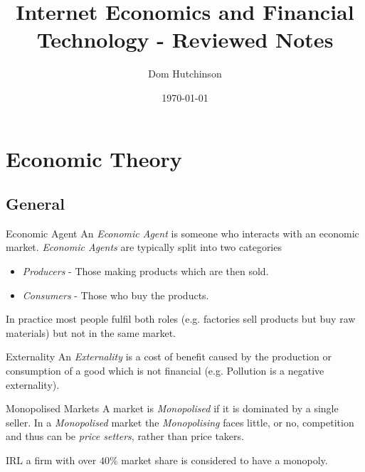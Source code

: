 \documentclass[11pt,a4paper]{article}
\begin{document}
\title{Internet Economics and Financial Technology - Reviewed Notes}
\author{Dom Hutchinson}
\date{\today}
\maketitle

\tableofcontents\newpage

\section{Economic Theory} \label{sec_EconomicTheory}

\subsection{General} \label{sec_GeneralEconomicTheory}

  \begin{definition}{Economic Agent}
    An \textit{Economic Agent} is someone who interacts with an economic market. \textit{Economic Agents} are typically split into two categories
    \begin{itemize}
      \item \textit{Producers} - Those making products which are then sold.
      \item \textit{Consumers} - Those who buy the products.
    \end{itemize}
    In practice most people fulfil both roles (e.g. factories sell products but buy raw materials) but not in the same market.
  \end{definition}

  \begin{definition}{Externality}
    An \textit{Externality} is a cost of benefit caused by the production or consumption of a good which is not financial (e.g. Pollution is a negative externality).
  \end{definition}

  \begin{definition}{Monopolised Markets}
    A market is \textit{Monopolised} if it is dominated by a single seller. In a \textit{Monopolised} market the \textit{Monopolising} faces little, or no, competition and thus can be \textit{price setters}, rather than price takers.
    \par IRL a firm with over $40\%$ market share is considered to have a monopoly.
  \end{definition}
\end{document}

